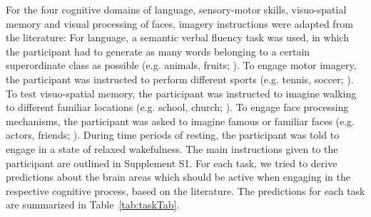 \documentclass[fleqn,10pt]{SelfArx} %
\begin{document}
For the four cognitive domains of language, sensory-motor skills, visuo-spatial memory and visual processing of faces, imagery instructions were adapted from the literature: For language, a semantic verbal fluency task was used, in which the participant had to generate as many words belonging to a certain superordinate class as possible (e.g. animals, fruits; \citet{Woermann_2003}). To engage motor imagery, the participant was instructed to perform different sports (e.g. tennis, soccer; \citet{Owen_2006}). To test visuo-spatial memory, the participant was instructed to imagine walking to different familiar locations (e.g. school, church; \citet{Jokeit_2001}). To engage face processing mechanisms, the participant was asked to imagine famous or familiar faces (e.g. actors, friends; \citet{O_Craven_2000}). During time periods of resting, the participant was told to engage in a state of relaxed wakefulness. The main instructions given to the participant are outlined in Supplement S1.  
For each task, we tried to derive predictions about the brain areas which should be active when engaging in the respective cognitive process, based on the literature. The predictions for each task are summarized in Table~\ref{tab:taskTab}.

\renewcommand{\arraystretch}{1.5}
\end{document}
